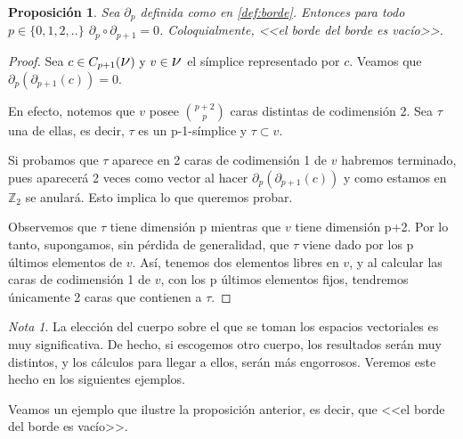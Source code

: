 \documentclass[12pt, a4paper]{article}
\numberwithin{equation}{section}
\theoremstyle{definition}
\theoremstyle{remark}
\newtheorem*{remark}{Nota}
\theoremstyle{plain}
\newtheorem{prop}{Proposición}
\begin{document}
	\begin{prop}
		Sea $\partial_{p}$ definida como en \ref{def:borde}. Entonces 
		para todo $p \in \{0,1,2,..\}$ $\partial_{p}\circ 
		\partial_{p+1}=0$. Coloquialmente, <<el borde del borde es 
		vacío>>.
	\end{prop}
	\begin{proof}
		Sea $c \in C_{p+1}(\text{{\Large $\nu$}})\text{ y }v\in 
		\text{{\Large $\nu$}}$ el símplice representado por $c$. 
		Veamos que $\partial_{p}(\partial_{p+1}(c))=0$.

		En efecto, notemos que $v$ posee $\binom{p+2}{p}$ 
		caras distintas de codimensión 2. Sea $\tau$ una de ellas, es 
		decir, $\tau$ es un p-1-símplice y $\tau \subset v$.

		Si probamos que $\tau$ aparece en 2 caras de codimensión 1 de 
		$v$ habremos terminado, pues aparecerá 2 veces como vector al 
		hacer $\partial_{p}(\partial_{p+1}(c))$ y como estamos en 
		$\mathbb{Z}_{2}$ se anulará. Esto implica lo que queremos
		probar.

		Observemos que $\tau$ tiene dimensión p mientras que $v$ tiene
		dimensión p+2. Por lo tanto, supongamos, sin pérdida de 
		generalidad, que $\tau$ viene dado por los p últimos elementos 
		de $v$. Así, tenemos dos elementos libres en $v$, y al 
		calcular las caras de codimensión 1 de $v$, con los p últimos 
		elementos fijos, tendremos únicamente 2 caras que contienen a
		$\tau$.  	
	\end{proof}
	\begin{remark}
		La elección del cuerpo sobre el que se toman los espacios 
		vectoriales es muy significativa. De hecho, si escogemos otro 
		cuerpo, los resultados serán muy distintos, y los cálculos 
		para llegar a ellos, serán más engorrosos. Veremos este hecho 
		en los siguientes ejemplos.
	\end{remark}

	Veamos un ejemplo que ilustre la proposición anterior, es decir, que 
	<<el borde del borde es vacío>>.
\end{document}
